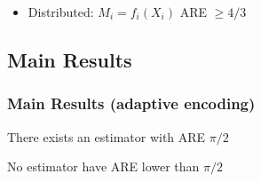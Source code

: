 \documentclass[mathserif]{beamer}
\newcommand{\sgn}{\mathsf{sign}}
\begin{document}
\begin{frame}
\begin{center}
\end{center}

\begin{itemize}
\item Distributed: $M_i = f_i(X_i)$  \hfill{ARE $\geq 4/3$}
\end{itemize}
\end{frame}

\subsection{Main Results}

\begin{frame}
\frametitle{Main Results (adaptive encoding)}

\begin{theorem}[achievability]
There exists an estimator with ARE $\pi/2$
\end{theorem}

\begin{theorem}[converse]
No estimator have ARE lower than $\pi/2$
\end{theorem}

\end{frame}
\end{document}
